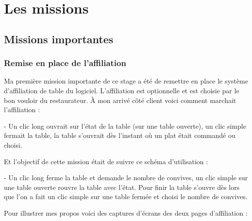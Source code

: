 \chapter{Les missions}


\section{Missions importantes}
\subsection{Remise en place de l'affiliation}


Ma première mission importante de ce stage a été de remettre en place le système d'affiliation de table du logiciel. L'affiliation est optionnelle et est choisie par le bon vouloir du restaurateur. À mon arrivé côté client voici comment marchait l'affiliation : 

- Un clic long ouvrait sur l'état de la table (sur une table ouverte), un clic simple fermait la table, la table s'ouvrait dès l'instant où un plat était commandé ou choisi.

Et l'objectif de cette mission était de suivre ce schéma d'utilisation :

- Un clic long ferme la table et demande le nombre de convives, un clic simple sur une table ouverte rouvre la table avec l'état. Pour finir la table s'ouvre dès lors que l'on a fait un clic simple sur une table fermée et choisi le nombre de convives.

Pour illustrer mes propos voici des captures d'écrans des deux pages d'affiliation :

